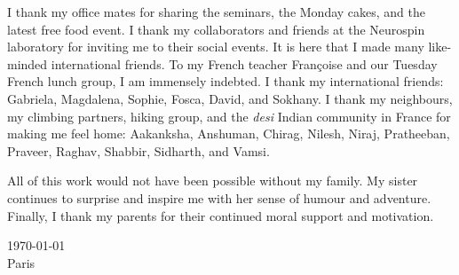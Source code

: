 I thank my office mates for sharing the seminars, the Monday cakes, and the latest free food event. I thank my collaborators and friends at the Neurospin laboratory for inviting me to their social events. It is here that I made many like-minded international friends. To my French teacher Françoise and our Tuesday French lunch group, I am immensely indebted. I thank my international friends: Gabriela, Magdalena, Sophie, Fosca, David, and Sokhany. I thank my neighbours, my climbing partners, hiking group, and the \textit{desi} Indian community in France for making me feel home: Aakanksha, Anshuman, Chirag, Nilesh, Niraj, Pratheeban, Praveer, Raghav, Shabbir, Sidharth, and Vamsi.

All of this work would not have been possible without my family. My sister continues to surprise and inspire me with her sense of humour and adventure. Finally, I thank my parents for their continued moral support and motivation.

\vspace{3em}
\today \\
Paris
